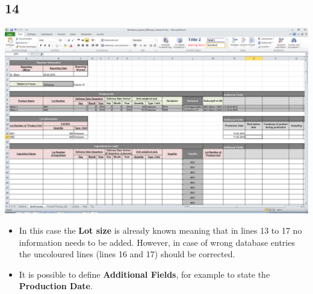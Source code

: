 \documentclass{beamer}
\begin{document}
\subsection{14}
\begin{frame}
	\begin{center}
  		\includegraphics[height=0.6\textheight]{14.png}
	\end{center}
	\begin{itemize}
		\item In this case the \textbf{Lot size} is already known meaning that in lines 13 to 17 no information needs to be added. However, in case of wrong database entries the uncoloured lines (lines 16 and 17) should be corrected.
		\item It is possible to define \textbf{Additional Fields}, for example to state the \textbf{Production Date}.
	\end{itemize}
\end{frame}
\end{document}

